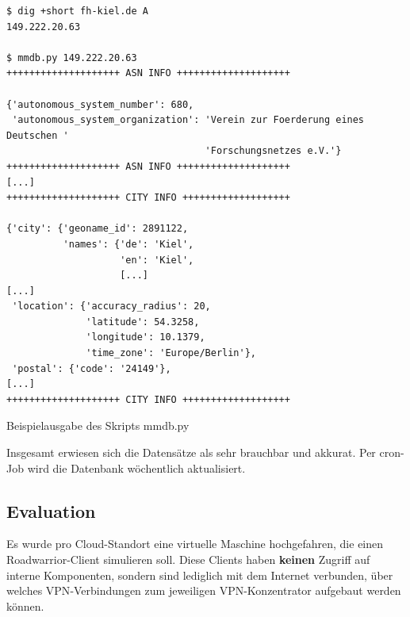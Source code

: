 \begin{listing}[h]
\begin{verbatim}
$ dig +short fh-kiel.de A
149.222.20.63

$ mmdb.py 149.222.20.63
++++++++++++++++++++ ASN INFO ++++++++++++++++++++

{'autonomous_system_number': 680,
 'autonomous_system_organization': 'Verein zur Foerderung eines Deutschen '
                                   'Forschungsnetzes e.V.'}
++++++++++++++++++++ ASN INFO ++++++++++++++++++++
[...]
++++++++++++++++++++ CITY INFO +++++++++++++++++++

{'city': {'geoname_id': 2891122,
          'names': {'de': 'Kiel',
                    'en': 'Kiel',
                    [...]
[...]
 'location': {'accuracy_radius': 20,
              'latitude': 54.3258,
              'longitude': 10.1379,
              'time_zone': 'Europe/Berlin'},
 'postal': {'code': '24149'},
[...]
++++++++++++++++++++ CITY INFO +++++++++++++++++++
\end{verbatim}
\caption{Beispielausgabe des Skripts mmdb.py}
\label{mmdb-example}
\end{listing}\FloatBarrier
Insgesamt erwiesen sich die Datensätze als sehr brauchbar und akkurat. Per cron-Job wird die Datenbank wöchentlich aktualisiert.

\subsection{Evaluation}

Es wurde pro Cloud-Standort eine virtuelle Maschine hochgefahren, die einen \gls{Roadwarrior}-\gls{Client} simulieren soll. Diese \gls{Client}s haben \textbf{keinen} Zugriff auf interne Komponenten, sondern sind lediglich mit dem Internet verbunden, über welches \gls{VPN}-Verbindungen zum jeweiligen \gls{VPN-Konzentrator} aufgebaut werden können.

